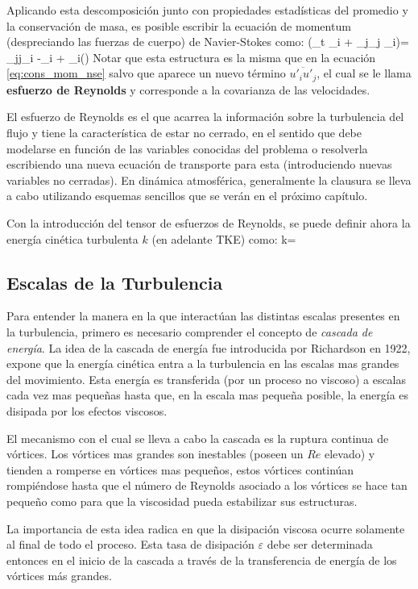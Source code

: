Aplicando esta descomposición junto con propiedades estadísticas del promedio y la conservación de masa, es posible escribir la ecuación de momentum (despreciando las fuerzas de cuerpo) de Navier-Stokes como:
\be\label{eq:03_cons_mom_rans}
(\partial_t _i + _j\partial_j _i)= \nu\partial_{jj}_i -\partial_i  + \partial_i()
\ee
Notar que esta estructura es la misma que en la ecuación \ref{eq:cons_mom_nse} salvo que aparece un nuevo término $\overline{u'_iu'_j}$, el cual se le llama \textbf{esfuerzo de Reynolds} y corresponde a la covarianza de las velocidades.

El esfuerzo de Reynolds es el que acarrea la información sobre la turbulencia del flujo y tiene la característica de estar no cerrado, en el sentido que debe modelarse en función de las variables conocidas del problema o resolverla escribiendo una nueva ecuación de transporte para esta (introduciendo nuevas variables no cerradas). En dinámica atmosférica, generalmente la clausura se lleva a cabo utilizando esquemas sencillos que se verán en el próximo capítulo.

Con la introducción del tensor de esfuerzos de Reynolds, se puede definir ahora la energía cinética turbulenta $k$ (en adelante TKE) como:
\be k= \ee
\subsection{Escalas de la Turbulencia}
Para entender la manera en la que interactúan las distintas escalas presentes en la turbulencia, primero es necesario comprender el concepto de \emph{cascada de energía}. La idea de la cascada de energía fue introducida por Richardson en 1922, expone que la energía cinética entra a la turbulencia en las escalas mas grandes del movimiento. Esta energía es transferida (por un proceso no viscoso) a escalas cada vez mas pequeñas hasta que, en la escala mas pequeña posible, la energía es disipada por los efectos viscosos.

El mecanismo con el cual se lleva a cabo la cascada es la ruptura continua de vórtices. Los vórtices mas grandes son inestables (poseen un $Re$ elevado) y tienden a romperse en vórtices mas pequeños, estos vórtices continúan rompiéndose hasta que el número de Reynolds asociado a los vórtices se hace tan pequeño como para que la viscosidad pueda estabilizar sus estructuras.

La importancia de esta idea radica en que la disipación viscosa ocurre solamente al final de todo el proceso. Esta tasa de disipación $\varepsilon$ debe ser determinada entonces en el inicio de la cascada a través de la transferencia de energía de los vórtices más grandes.


